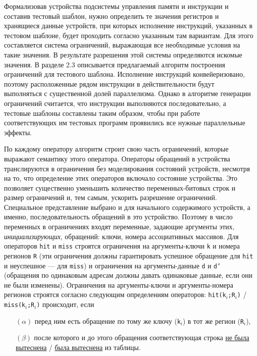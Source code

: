 \documentclass[14pt,autoref,href
,facsimile
]{disser}
\begin{document}
Формализовав устройства подсистемы управления памяти и инструкции и составив тестовый шаблон, нужно определить те значения регистров и хранящиеся данные устройств, при которых исполнение инструкций, указанных в тестовом шаблоне, будет проходить согласно указанным там вариантам. Для этого составляется система ограничений, выражающая все необходимые условия на такие значения. В результате разрешения этой системы определяются искомые значения. В разделе 2.3 описывается предлагаемый алгоритм построения ограничений для тестового шаблона. Исполнение инструкций конвейеризовано, поэтому расположенные рядом инструкции в действительности будут выполняться с существенной долей параллелизма. Однако в алгоритме генерации ограничений считается, что инструкции выполняются последовательно, а тестовые шаблоны составлены таким образом, чтобы при работе соответствующих им тестовых программ проявились все нужные параллельные эффекты.

По каждому оператору алгоритм строит свою часть ограничений, которые выражают семантику этого оператора. Операторы обращений в устройства транслируются в ограничения без моделирования состояний устройств, несмотря на то, что определение этих операторов включало состояние устройства. Это позволяет существенно уменьшить количество переменных-битовых строк и размер ограничений и, тем самым, ускорить разрешение ограничений. Специальное представление выбрано и для начального содержимого устройств, а именно, последовательность обращений в это устройство. Поэтому в число переменных в ограничениях входят переменные, задающие аргументы этих, \emph{инициализирующих}, обращений: ключи, номера ассоциативных массивов. Для операторов \texttt{hit} и \texttt{miss} строятся ограничения на аргументы-ключи \texttt{k} и номера регионов \texttt{R} (эти ограничения должны гарантировать успешное обращение для \texttt{hit} и неуспешное --- для \texttt{miss}) и ограничения на аргументы-данные \texttt{d} и \texttt{d'} (обращения по одинаковым адресам должны давать одинаковые данные, если они не были изменены). Ограничения на аргументы-ключи и аргументы-номера регионов строятся согласно следующим определениям операторов: \texttt{hit(k$_i$;R$_i$)} / \texttt{miss(k$_i$;R$_i$)} происходит, если
\begin{itemize}
\item[$(\alpha)$] перед ним есть обращение по тому же ключу (\texttt{k}$_i$) в тот же регион (\texttt{R}$_i$),
\item[$(\beta)$] после которого и до этого обращения соответствующая строка \underline{не была} \underline{вытеснена} / \underline{была вытеснена} из таблицы.
\end{itemize}
\end{document}
